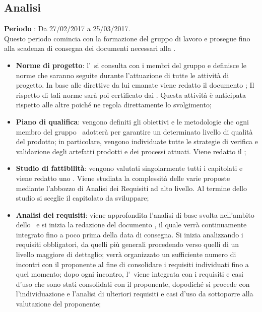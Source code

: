 \documentclass[../PianoDiProgetto.tex]{subfiles}
\begin{document}
		\subsection{Analisi}
		\textbf{Periodo} : Da 27/02/2017 a 25/03/2017. \\
		Questo periodo comincia con la formazione del gruppo di lavoro e prosegue fino alla scadenza di consegna dei documenti necessari alla \revisionedeirequisiti.
		\begin{itemize}
			\item \textbf{Norme di progetto}: l'\amministratore\ si consulta con i membri del gruppo e definisce le norme che saranno seguite durante l'attuazione di tutte le attività di progetto. In base alle direttive da lui emanate viene redatto il documento \normediprogetto; Il rispetto di tali norme sarà poi certificato dai \verificatori. Questa attività è anticipata rispetto alle altre poiché ne regola direttamente lo svolgimento;
			\item \textbf{Piano di qualifica}: vengono definiti gli obiettivi e le metodologie che ogni membro del gruppo
			\kaleidoscode\ adotterà per garantire un determinato livello di qualità del prodotto; in particolare, vengono individuate tutte le strategie di verifica e validazione degli artefatti prodotti e dei processi attuati. Viene redatto il \pianodiqualifica;
			\item \textbf{Studio di fattibilità}: vengono valutati singolarmente tutti i capitolati e viene redatto uno \studiodifattibilita. Viene studiata la complessità delle varie proposte mediante l’abbozzo di Analisi dei Requisiti ad alto livello. Al termine dello studio si sceglie il capitolato da sviluppare;
			
			\item \textbf{Analisi dei requisiti}: viene approfondita l'analisi di base svolta nell'ambito dello \studiodifattibilita\ e si inizia la redazione del documento \analisideirequisiti, il quale verrà continuamente integrato fino a poco prima della data di consegna. Si inizia analizzando i requisiti obbligatori, da quelli più generali procedendo verso quelli di un livello maggiore  di dettaglio;  verrà organizzato un sufficiente numero di incontri con il proponente al fine di consolidare i requisiti individuati fino a quel momento; dopo ogni incontro, l'\analisideirequisiti\ viene integrata con i requisiti e casi d'uso che sono stati consolidati con il proponente, dopodiché si procede con l'individuazione e l'analisi di ulteriori requisiti e casi d'uso da sottoporre alla valutazione del proponente;
		

\end{itemize}
\end{document}
